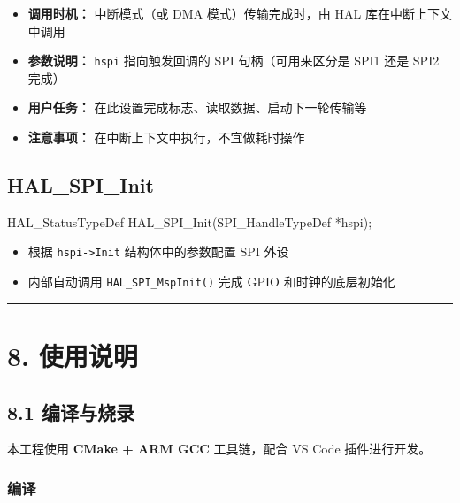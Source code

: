 \documentclass[
  chinese,
  UTF8,
  oneside,
  openany]{ctexbook}
\newenvironment{Shaded}{}{}
\newcommand{\NormalTok}[1]{#1}
\newcommand{\OperatorTok}[1]{\textcolor[rgb]{0.40,0.40,0.40}{#1}}
\providecommand{\tightlist}{%
  \setlength{\itemsep}{0pt}\setlength{\parskip}{0pt}}
\begin{document}
\begin{itemize}
\tightlist
\item
  \textbf{调用时机：} 中断模式（或 DMA 模式）传输完成时，由 HAL
  库在中断上下文中调用
\item
  \textbf{参数说明：} \texttt{hspi} 指向触发回调的 SPI
  句柄（可用来区分是 SPI1 还是 SPI2 完成）
\item
  \textbf{用户任务：} 在此设置完成标志、读取数据、启动下一轮传输等
\item
  \textbf{注意事项：} 在中断上下文中执行，不宜做耗时操作
\end{itemize}

\subsection{HAL\_SPI\_Init}\label{hal_spi_init}

\begin{Shaded}
\begin{Highlighting}[]
\NormalTok{HAL\_StatusTypeDef HAL\_SPI\_Init}\OperatorTok{(}\NormalTok{SPI\_HandleTypeDef }\OperatorTok{*}\NormalTok{hspi}\OperatorTok{);}
\end{Highlighting}
\end{Shaded}

\begin{itemize}
\tightlist
\item
  根据 \texttt{hspi-\textgreater{}Init} 结构体中的参数配置 SPI 外设
\item
  内部自动调用 \texttt{HAL\_SPI\_MspInit()} 完成 GPIO 和时钟的底层初始化
\end{itemize}

\begin{center}\rule{0.5\linewidth}{0.5pt}\end{center}

\section{8. 使用说明}\label{ux4f7fux7528ux8bf4ux660e-3}

\subsection{8.1 编译与烧录}\label{ux7f16ux8bd1ux4e0eux70e7ux5f55-3}

本工程使用 \textbf{CMake + ARM GCC} 工具链，配合 VS Code 插件进行开发。

\subsubsection{编译}\label{ux7f16ux8bd1-2}
\end{document}
